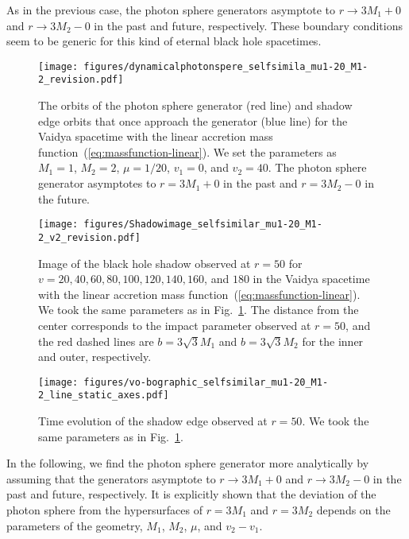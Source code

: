 \documentclass[prd,showpacs,preprintnumbers,groupedaddress,superscriptaddress,nofootinbib,11pt]{revtex4-1} %
\theoremstyle{newplain}
\begin{document}
As in the previous case, the photon sphere generators asymptote to $r\to 3M_1+0$ and $r\to 3M_2-0$ in the past and future, respectively.
These boundary conditions seem to be generic for this kind of eternal black hole spacetimes.
\begin{figure}[t]
\texttt{[image: figures/dynamicalphotonspere\_selfsimila\_mu1-20\_M1-2\_revision.pdf]}
\caption{\label{fig:psgenerator-linear} 
The orbits of the photon sphere generator (red line) and shadow edge orbits that once approach the generator (blue line) for the Vaidya spacetime with the linear accretion mass function~(\ref{eq:massfunction-linear}).
We set the parameters as $M_1=1$, $M_2=2$, $\mu=1/20$, $v_1=0$, and $v_2=40$.
The photon sphere generator asymptotes to $r=3M_1+0$ in the past and $r=3M_2-0$ in the future.
}
\end{figure}

\begin{figure}[t]
\texttt{[image: figures/Shadowimage\_selfsimilar\_mu1-20\_M1-2\_v2\_revision.pdf]}
\caption{\label{fig:Shadowimage-linear} 
Image of the black hole shadow observed at $r=50$ for $v=20, 40, 60, 80, 100, 120, 140, 160$, and $180$ in the Vaidya spacetime with the linear accretion mass function~(\ref{eq:massfunction-linear}). We took the same parameters as in Fig.~\ref{fig:psgenerator-linear}. The distance from the center corresponds to the impact parameter observed at $r=50$, and the red dashed lines are $b=3 \sqrt{3} M_1$ and $b=3 \sqrt{3}M_2$ for the inner and outer, respectively.
}
\end{figure}

\begin{figure}[h]
\texttt{[image: figures/vo-bographic\_selfsimilar\_mu1-20\_M1-2\_line\_static\_axes.pdf]}
\caption{\label{fig:vo-bo_graph-self_similar} 
Time evolution of the shadow edge observed at $r=50$. 
We took the same parameters as in Fig.~\ref{fig:psgenerator-linear}.
}
\end{figure}



\par
In the following, we find the photon sphere generator more analytically by assuming that the generators asymptote to $r\to 3M_1+0$ and $r\to 3M_2-0$ in the past and future, respectively.
It is explicitly shown that the deviation of the photon sphere from the hypersurfaces of $r=3M_1$ and $r=3M_2$ depends on the parameters of the geometry, $M_1$, $M_2$, $\mu$, and $v_2-v_1$.
\end{document}
